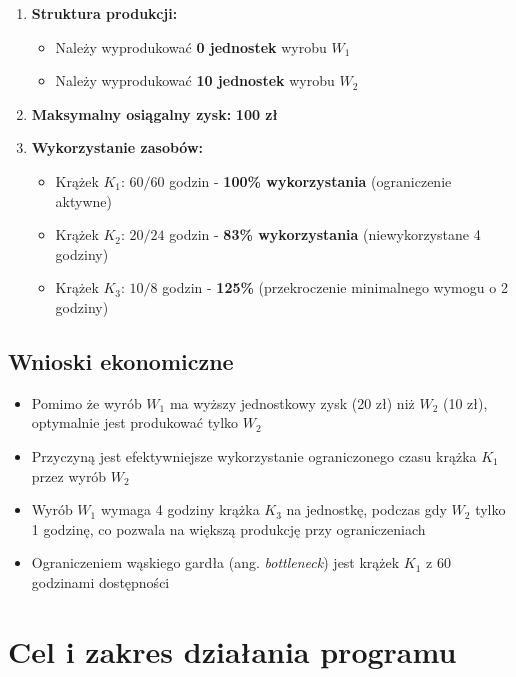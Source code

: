 \documentclass[12pt,a4paper]{article}
\begin{document}
\begin{enumerate}
    \item \textbf{Struktura produkcji:}
    \begin{itemize}
        \item Należy wyprodukować \textbf{0 jednostek} wyrobu $W_1$
        \item Należy wyprodukować \textbf{10 jednostek} wyrobu $W_2$
    \end{itemize}
    
    \item \textbf{Maksymalny osiągalny zysk:} \textbf{100 zł}
    
    \item \textbf{Wykorzystanie zasobów:}
    \begin{itemize}
        \item Krążek $K_1$: $60/60$ godzin - \textbf{100\% wykorzystania} (ograniczenie aktywne)
        \item Krążek $K_2$: $20/24$ godzin - \textbf{83\% wykorzystania} (niewykorzystane 4 godziny)
        \item Krążek $K_3$: $10/8$ godzin - \textbf{125\%} (przekroczenie minimalnego wymogu o 2 godziny)
    \end{itemize}
\end{enumerate}

\subsection{Wnioski ekonomiczne}

\begin{itemize}
    \item Pomimo że wyrób $W_1$ ma wyższy jednostkowy zysk (20 zł) niż $W_2$ (10 zł), optymalnie jest produkować tylko $W_2$
    \item Przyczyną jest efektywniejsze wykorzystanie ograniczonego czasu krążka $K_1$ przez wyrób $W_2$
    \item Wyrób $W_1$ wymaga 4 godziny krążka $K_3$ na jednostkę, podczas gdy $W_2$ tylko 1 godzinę, co pozwala na większą produkcję przy ograniczeniach
    \item Ograniczeniem wąskiego gardła (ang. \textit{bottleneck}) jest krążek $K_1$ z 60 godzinami dostępności
\end{itemize}

\section{Cel i zakres działania programu}
\end{document}
